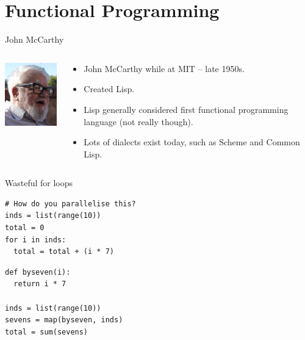 \section{Functional Programming}
\begin{frame}{John McCarthy}
  \begin{columns}
    \begin{column}{0.2\textwidth}
      \includegraphics[width=1.2in]{img/john-mccarthy.png}
    \end{column}
    \begin{column}{0.7\textwidth}
      \begin{itemize}
        \item John McCarthy while at MIT -- late 1950s.
        \vspace{0.25cm}
        \item Created Lisp.
        \vspace{0.25cm}
        \item Lisp generally considered first functional programming language (not really though).
        \vspace{0.25cm}
        \item Lots of dialects exist today, such as Scheme and Common Lisp.
      \end{itemize}
    \end{column}
  \end{columns}
\end{frame}

\begin{frame}[fragile]{Wasteful for loops}
  \begin{verbatim}
# How do you parallelise this?
inds = list(range(10))
total = 0
for i in inds:
  total = total + (i * 7)
  \end{verbatim}
  \begin{verbatim}
def byseven(i):
  return i * 7

inds = list(range(10))
sevens = map(byseven, inds)
total = sum(sevens)
  \end{verbatim}
\end{frame}

